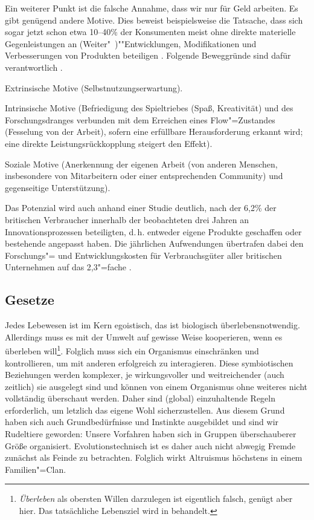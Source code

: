 Ein weiterer Punkt ist die falsche Annahme, dass wir nur für Geld arbeiten. Es gibt genügend andere Motive. Dies beweist beispielsweise die Tatsache, dass sich sogar jetzt schon etwa 10--40\% der Konsumenten meist ohne direkte materielle Gegenleistungen an (Weiter"~)""Entwicklungen, Modifikationen und Verbesserungen von Produkten beteiligen \citep[S.~11]{piller_oi_2006}. Folgende Beweggründe sind dafür verantwortlich \citep[SS.~11--13]{piller_oi_2006}.
\begin{compactitem}
\item Extrinsische Motive (Selbstnutzungserwartung).
\item Intrinsische Motive (Befriedigung des Spieltriebes (Spaß, Kreativität) und des Forschungsdranges verbunden mit dem Erreichen eines Flow"=Zustandes (Fesselung von der Arbeit), sofern eine erfüllbare Herausforderung erkannt wird; eine direkte Leistungsrückkopplung steigert den Effekt).
\item Soziale Motive (Anerkennung der eigenen Arbeit (von anderen Menschen, insbesondere von Mitarbeitern oder einer entsprechenden Community) und gegenseitige Unterstützung).
\end{compactitem}
Das Potenzial wird auch anhand einer Studie deutlich, nach der 6,2\% der britischen Verbraucher innerhalb der beobachteten drei Jahren an Innovationsprozessen beteiligten, d.\,h. entweder eigene Produkte geschaffen oder bestehende angepasst haben. Die jährlichen Aufwendungen übertrafen dabei den Forschungs"= und Entwicklungskosten für Verbrauchsgüter aller britischen Unternehmen auf das 2,3"=fache \citep{hippel_2010}.

\subsection{Gesetze}\label{sec:situation/laws}

Jedes Lebewesen ist im Kern egoistisch, das ist biologisch überlebensnotwendig. Allerdings muss es mit der Umwelt auf gewisse Weise kooperieren, wenn es überleben will\footnote{\textit{Überleben} als obersten Willen darzulegen ist eigentlich falsch, genügt aber hier. Das tatsächliche Lebensziel wird in  behandelt.}. Folglich muss sich ein Organismus einschränken und kontrollieren, um mit anderen erfolgreich zu interagieren. Diese symbiotischen Beziehungen werden komplexer, je wirkungsvoller und weitreichender (auch zeitlich) sie ausgelegt sind und können von einem Organismus ohne weiteres nicht vollständig überschaut werden. Daher sind (global) einzuhaltende Regeln erforderlich, um letzlich das eigene Wohl sicherzustellen. Aus diesem Grund haben sich auch Grundbedürfnisse und Instinkte ausgebildet und sind wir Rudeltiere geworden: Unsere Vorfahren haben sich in Gruppen überschauberer Größe organisiert. Evolutionstechnisch ist es daher auch nicht abwegig Fremde zunächst als Feinde zu betrachten. Folglich wirkt Altruismus höchstens in einem Familien"=Clan.

